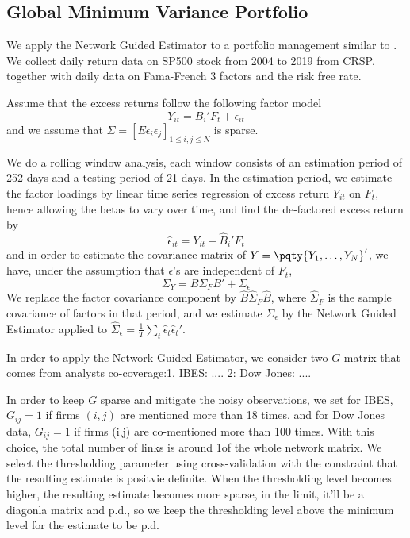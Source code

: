 \subsection{Global Minimum Variance Portfolio}

We apply the Network Guided Estimator to a portfolio management similar to \cite{ledoit2004HoneyShrunk}. We collect daily return data on SP500 stock from 2004 to 2019 from CRSP, together with daily data on Fama-French 3 factors and the risk free rate. 

Assume that the excess returns follow the following factor model
\begin{equation*}
    Y_{it} = B_{i}'F_{t} + \epsilon_{it}
\end{equation*}
and we assume that \(\Sigma = [E \epsilon_{i} \epsilon_{j}]_{1 \leq i,j\leq N}\) is sparse. 

We do a rolling window analysis, each window consists of an estimation period of 252 days and a testing period of 21 days. In the estimation period, we estimate the factor loadings by linear time series regression of excess return \(Y_{it}\) on \(F_{t}\), hence allowing the betas to vary over time, and find the de-factored excess return by 
\begin{equation*}
    \hat{\epsilon}_{it} = Y_{it} - \hat{B}_{i}'F_{t}
\end{equation*}
and in order to estimate the covariance matrix of \(Y = \pqty{Y_{1}, \dots, Y_{N}}'\), we have, under the assumption that \(\epsilon\)'s are independent of \(F_{t}\), 
\begin{equation*}
    \Sigma_{Y} = B \Sigma_{F} B' + \Sigma_{\epsilon}
\end{equation*}
We replace the factor covariance component by \(\hat{B} \hat{\Sigma}_{F} \hat{B}\), where \(\hat{\Sigma}_{F}\) is the sample covariance of factors in that period, and we estimate \(\Sigma_{\epsilon}\) by the Network Guided Estimator applied to \(\hat{\Sigma}_{\epsilon} = \frac{1}{T} \sum_{t}\hat{\epsilon}_{t} \hat{\epsilon}_{t}'\). 

In order to apply the Network Guided Estimator, we consider two \(G\) matrix that comes from analysts co-coverage:1. IBES: .... 2: Dow Jones: .... 

In order to keep \(G\) sparse and mitigate the noisy observations, we set for IBES, \(G_{ij} = 1\) if firms \((i,j)\) are mentioned more than 18 times, and for Dow Jones data, \(G_{ij} =1\) if firms (i,j) are co-mentioned more than 100 times. With this choice, the total number of links is around 1\textperthousand of the whole network matrix. We select the thresholding parameter using cross-validation with the constraint that the resulting estimate is positvie definite. When the thresholding level becomes higher, the resulting estimate becomes more sparse, in the limit, it'll be a diagonla matrix and p.d., so we keep the thresholding level above the minimum level for the estimate to be p.d. 

